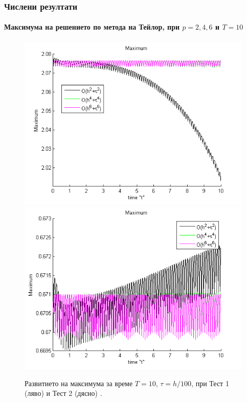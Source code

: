\documentclass{beamer}
\begin{document}
\begin{frame}
\frametitle{Числени резултати}
\framesubtitle{Максимума на решението по метода на Тейлор, при $p=2,4,6$ и $T=10$}

\begin{figure}[ht]
	\centering
	\begin{minipage}[b]{0.4\linewidth}
		\includegraphics[width=\linewidth]{../amitans/figures/maximum_30_bt3_c045_h005.png}
	\end{minipage}	
	\begin{minipage}[b]{0.4\linewidth}
		 \includegraphics[width=\linewidth]{../amitans/figures/maximum_128_bt1_c090_h010.png}
	\end{minipage}

Развитието на максимума за време $T=10$, $\tau = h/100$, при Тест 1 (ляво) и Тест 2 (дясно) .
\end{figure}

\end{frame}
\end{document}
